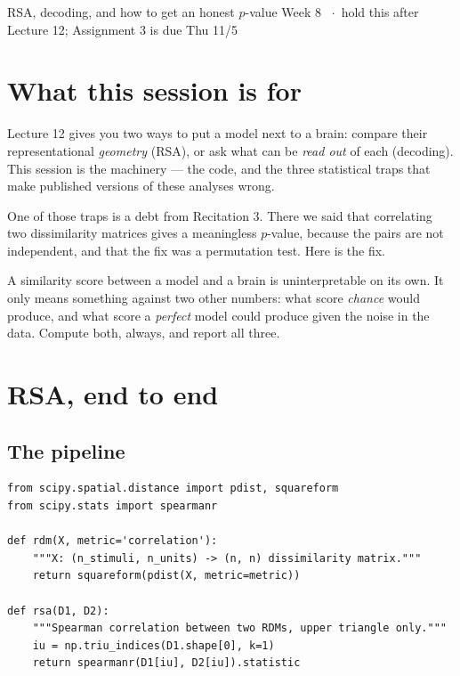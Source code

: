 \documentclass[11pt]{article}
\begin{document}
  {RSA, decoding, and how to get an honest $p$-value}
  {Week 8 \ $\cdot$\ hold this after Lecture 12; Assignment 3 is due Thu 11/5}

\section*{What this session is for}

Lecture 12 gives you two ways to put a model next to a brain: compare their
representational \emph{geometry} (RSA), or ask what can be \emph{read out} of
each (decoding). This session is the machinery --- the code, and the three
statistical traps that make published versions of these analyses wrong.

One of those traps is a debt from Recitation 3. There we said that correlating
two dissimilarity matrices gives a meaningless $p$-value, because the pairs are
not independent, and that the fix was a permutation test. Here is the fix.

\begin{keybox}
 A similarity score between a model and a brain is
uninterpretable on its own. It only means something against two other numbers:
what score \emph{chance} would produce, and what score a \emph{perfect} model
could produce given the noise in the data. Compute both, always, and report all
three.
\end{keybox}

\section{RSA, end to end}

\subsection{The pipeline}

\begin{lstlisting}
from scipy.spatial.distance import pdist, squareform
from scipy.stats import spearmanr

def rdm(X, metric='correlation'):
    """X: (n_stimuli, n_units) -> (n, n) dissimilarity matrix."""
    return squareform(pdist(X, metric=metric))

def rsa(D1, D2):
    """Spearman correlation between two RDMs, upper triangle only."""
    iu = np.triu_indices(D1.shape[0], k=1)
    return spearmanr(D1[iu], D2[iu]).statistic
\end{lstlisting}
\end{document}
